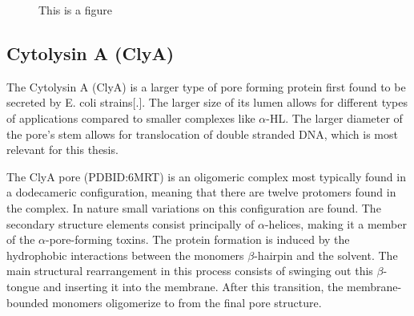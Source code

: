 \begin{figure}[ht]
\begin{centering}
  \caption{This is a figure}
  \label{fig:alphaHL}
  \end{centering}
\end{figure}

\newpage
\subsection{Cytolysin A (ClyA)}

The Cytolysin A (ClyA) is a larger type of pore forming protein first found to be
secreted by E. coli strains[.]. The larger size of its lumen allows for different types
of applications compared to smaller complexes like $\alpha$-HL. The larger diameter of
the pore's stem allows for translocation of double stranded DNA, which is most relevant
for this thesis.

The ClyA pore (PDBID:6MRT\cite{Peng2019}) is an oligomeric complex most typically found
 in a dodecameric configuration, meaning that there are twelve protomers found in the
complex. In nature small variations on this configuration are found. The secondary
structure elements consist principally of $\alpha$-helices, making it a member of the $
\alpha$-pore-forming toxins. The protein formation is induced by the hydrophobic
interactions between the monomers $\beta$-hairpin and the solvent. The main
structural rearrangement in this process consists of swinging out this $\beta$-tongue and
inserting it into the membrane. After this transition, the membrane-bounded monomers
oligomerize to from the final pore structure. \cite{Benke2015}


